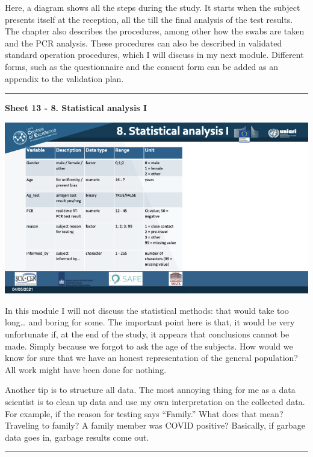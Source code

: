 \documentclass[
]{book}
\begin{document}
Here, a diagram shows all the steps during the study. It starts when the
subject presents itself at the reception, all the till the final
analysis of the test results. The chapter also describes the procedures,
among other how the swabs are taken and the PCR analysis. These
procedures can also be described in validated standard operation
procedures, which I will discuss in my next module. Different forms,
such as the questionnaire and the consent form can be added as an
appendix to the validation plan.

\begin{center}\rule{0.5\linewidth}{0.5pt}\end{center}

\textbf{Sheet 13 - 8. Statistical analysis I}

\includegraphics{images/m03/m03_validation_of_test_kits_v2_2.013.jpeg}

In this module I will not discuss the statistical methods: that would
take too long\ldots{} and boring for some. The important point here is that,
it would be very unfortunate if, at the end of the study, it appears
that conclusions cannot be made. Simply because we forgot to ask the age
of the subjects. How would we know for sure that we have an honest
representation of the general population? All work might have been done
for nothing.

Another tip is to structure all data. The most annoying thing for me as
a data scientist is to clean up data and use my own interpretation on
the collected data. For example, if the reason for testing says
``Family.'' What does that mean? Traveling to family? A
family member was COVID positive? Basically, if garbage data goes in,
garbage results come out.

\begin{center}\rule{0.5\linewidth}{0.5pt}\end{center}
\end{document}
